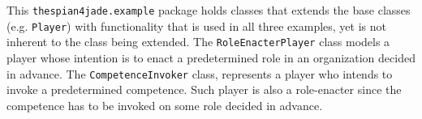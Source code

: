 This \texttt{thespian4jade.example} package holds classes that extends the base classes (e.g. \texttt{Player}) with functionality that is used in all three examples, yet is not inherent to the class being extended.
The \texttt{RoleEnacterPlayer} class models a player whose intention is to enact a predetermined role in an organization decided in advance.
The \texttt{CompetenceInvoker} class, represents a player who intends to invoke a predetermined competence. Such player is also a role-enacter since the competence has to be invoked on some role decided in advance.  